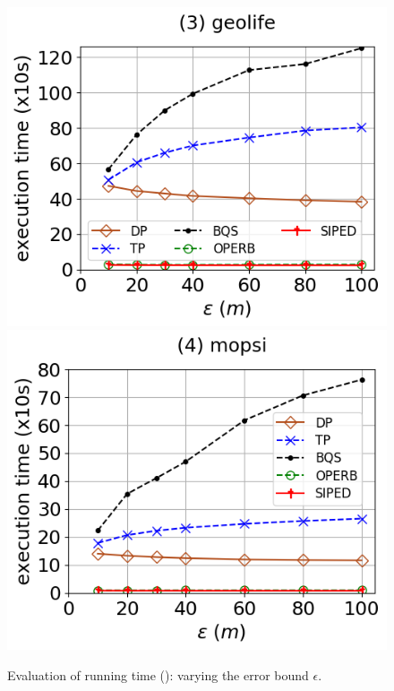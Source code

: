 \begin{figure}[tb!]
	\includegraphics[scale=0.315]{Figures/Exp-PED-time-epsilon-geolife.png}	\hspace{1ex}
	\includegraphics[scale=0.315]{Figures/Exp-PED-time-epsilon-mopsi.png}	\hspace{1ex}
	\vspace{-3ex}
	\caption{\small Evaluation of running time (\ped): varying the error bound $\epsilon$.}\label{fig:time-epsilon-ped}
	\vspace{-2ex}
\end{figure}

